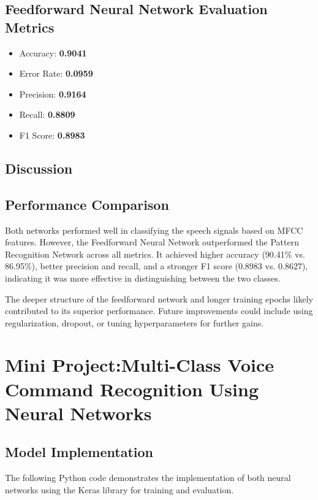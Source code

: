 \documentclass[a4paper,12pt]{article}
\begin{document}
\subsection*{Feedforward Neural Network Evaluation Metrics}
\begin{itemize}
    \item Accuracy: \textbf{0.9041}
    \item Error Rate: \textbf{0.0959}
    \item Precision: \textbf{0.9164}
    \item Recall: \textbf{0.8809}
    \item F1 Score: \textbf{0.8983}
\end{itemize}

\subsection{Discussion}

\subsection*{Performance Comparison}

Both networks performed well in classifying the speech signals based on MFCC features. However, the Feedforward Neural Network outperformed the Pattern Recognition Network across all metrics. It achieved higher accuracy (90.41\% vs. 86.95\%), better precision and recall, and a stronger F1 score (0.8983 vs. 0.8627), indicating it was more effective in distinguishing between the two classes.

The deeper structure of the feedforward network and longer training epochs likely contributed to its superior performance. Future improvements could include using regularization, dropout, or tuning hyperparameters for further gains.
\section{Mini Project:Multi-Class Voice Command Recognition Using Neural Networks}
\subsection{Model Implementation}
The following Python code demonstrates the implementation of both neural networks using the Keras library for training and evaluation.
\end{document}
